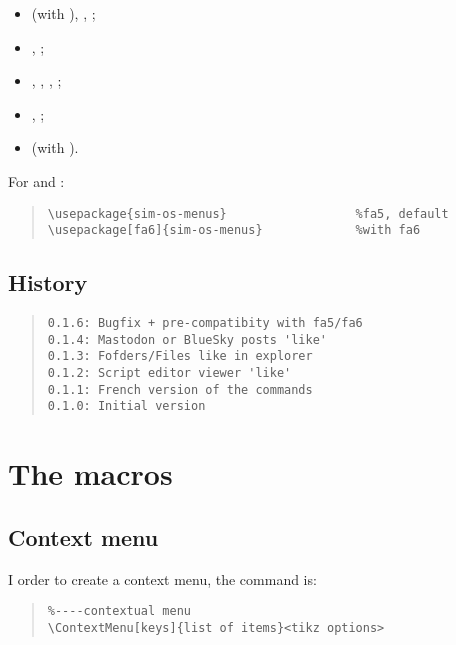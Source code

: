 \documentclass[11pt,a4paper]{ltxdoc}
\begin{document}
\begin{itemize}
	\item {} (with ), , ;
	\item {}, ;
	\item {}, , , ;
	\item {}, ;
	\item {} (with ).
\end{itemize}

For  and  :

\begin{quote}
\begin{verbatim}
\usepackage{sim-os-menus}                  %fa5, default
\usepackage[fa6]{sim-os-menus}             %with fa6
\end{verbatim}
\end{quote}

\vfill

\subsection{History}

\begin{quote}
\begin{verbatim}
0.1.6: Bugfix + pre-compatibity with fa5/fa6
0.1.4: Mastodon or BlueSky posts 'like'
0.1.3: Fofders/Files like in explorer
0.1.2: Script editor viewer 'like'
0.1.1: French version of the commands
0.1.0: Initial version
\end{verbatim}
\end{quote}

\pagebreak

\section{The macros}

\subsection{Context menu}

I order to create a context menu, the command is:

\begin{quote}
\begin{verbatim}
%----contextual menu
\ContextMenu[keys]{list of items}<tikz options>
\end{verbatim}
\end{quote}
\end{document}
